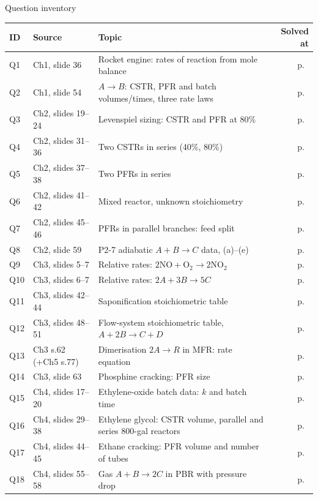 \documentclass[10pt,a4paper]{article}
\newcommand{\spsection}[1]{%
  \par\addvspace{10pt}\noindent
  \colorbox{accent}{%
    \begin{minipage}{\dimexpr\linewidth-14pt\relax}%
      \color{white}\bfseries\large\strut #1\strut
    \end{minipage}}\par\vspace{4pt}\nopagebreak}
\providecommand{\toprule}{\hline}
\providecommand{\midrule}{\hline}
\begin{document}
\spsection{Question inventory}
\begin{footnotesize}\setlength{\tabcolsep}{2pt}
\noindent\begin{tabularx}{\linewidth}{@{}l l X r@{}}
\toprule
ID & Source & Topic & Solved at\\
\midrule
Q1  & Ch1, slide 36 & Rocket engine: rates of reaction from mole balance & p.~\pageref{q:1}\\
Q2  & Ch1, slide 54 & $A\to B$: CSTR, PFR and batch volumes/times, three rate laws & p.~\pageref{q:2}\\
Q3  & Ch2, slides 19--24 & Levenspiel sizing: CSTR and PFR at 80\% & p.~\pageref{q:3}\\
Q4  & Ch2, slides 31--36 & Two CSTRs in series (40\%, 80\%) & p.~\pageref{q:4}\\
Q5  & Ch2, slides 37--38 & Two PFRs in series & p.~\pageref{q:5}\\
Q6  & Ch2, slides 41--42 & Mixed reactor, unknown stoichiometry & p.~\pageref{q:6}\\
Q7  & Ch2, slides 45--46 & PFRs in parallel branches: feed split & p.~\pageref{q:7}\\
Q8  & Ch2, slide 59 & P2-7 adiabatic $A+B\to C$ data, (a)--(e) & p.~\pageref{q:8}\\
Q9  & Ch3, slides 5--7 & Relative rates: $2\mathrm{NO}+\mathrm{O_2}\to2\mathrm{NO_2}$ & p.~\pageref{q:9}\\
Q10 & Ch3, slides 6--7 & Relative rates: $2A+3B\to5C$ & p.~\pageref{q:10}\\
Q11 & Ch3, slides 42--44 & Saponification stoichiometric table & p.~\pageref{q:11}\\
Q12 & Ch3, slides 48--51 & Flow-system stoichiometric table, $A+2B\to C+D$ & p.~\pageref{q:12}\\
Q13 & Ch3 s.62 (+Ch5 s.77) & Dimerisation $2A\to R$ in MFR: rate equation & p.~\pageref{q:13}\\
Q14 & Ch3, slide 63 & Phosphine cracking: PFR size & p.~\pageref{q:14}\\
Q15 & Ch4, slides 17--20 & Ethylene-oxide batch data: $k$ and batch time & p.~\pageref{q:15}\\
Q16 & Ch4, slides 29--38 & Ethylene glycol: CSTR volume, parallel and series 800-gal reactors & p.~\pageref{q:16}\\
Q17 & Ch4, slides 44--45 & Ethane cracking: PFR volume and number of tubes & p.~\pageref{q:17}\\
Q18 & Ch4, slides 55--58 & Gas $A+B\to2C$ in PBR with pressure drop & p.~\pageref{q:18}\\

\end{tabularx}
\end{footnotesize}
\end{document}
